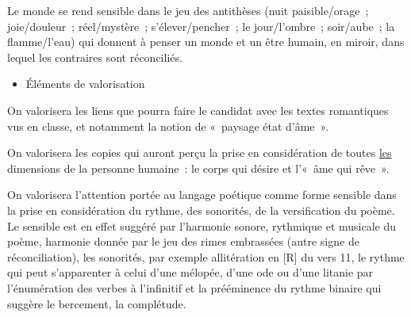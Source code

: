 {Le monde se rend sensible dans le jeu des antithèses (nuit paisible/orage~;
joie/douleur~; réel/mystère~; s'élever/pencher~; le jour/l'ombre~; soir/aube~; la
flamme/l'eau) qui donnent à penser un monde et un être humain, en miroir, dans lequel
les contraires sont réconciliés.

\begin{itemize}[label=\textbullet]
\item Éléments de valorisation
\end{itemize}

On valorisera les liens que pourra faire le candidat avec les textes romantiques vus en
classe, et notamment la notion de «~paysage état d'âme~».

On valorisera les copies qui auront perçu la prise en considération de toutes \underline{les}
dimensions de la personne humaine~: le corps qui désire et l'«~âme qui rêve~».

On valorisera l'attention portée au langage poétique comme forme sensible dans la
prise en considération du rythme, des sonorités, de la versification du poème. Le
sensible est en effet suggéré par l'harmonie sonore, rythmique et musicale du poème,
harmonie donnée par le jeu des rimes embrassées (autre signe de réconciliation), les
sonorités, par exemple allitération en [R] du vers 11, le rythme qui peut s'apparenter à
celui d'une mélopée, d'une ode ou d'une litanie par l'énumération des verbes à l'infinitif
et la prééminence du rythme binaire qui suggère le bercement, la complétude.}%
